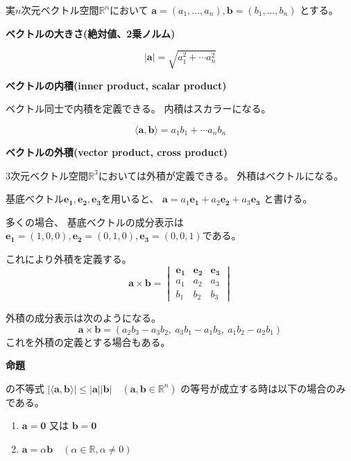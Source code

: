 \documentclass[12pt,b5paper]{ltjsarticle}
\begin{document}
実$n$次元ベクトル空間$\mathbb{R}^n$において
$\bm{a}=(a_1,\dots,a_n), \bm{b}=(b_1,\dots,b_n)$
とする。

\textbf{ベクトルの大きさ(絶対値、2乗ノルム)}

\begin{equation}
 \lvert \bm{a} \rvert = \sqrt{ a_1^2 + \cdots a_n^2}
\end{equation}

\textbf{ベクトルの内積(inner product, scalar product)}

ベクトル同士で内積を定義できる。
内積はスカラーになる。

\begin{equation}
 \langle \bm{a}, \bm{b} \rangle = a_1b_1 + \cdots a_nb_n
\end{equation}

\textbf{ベクトルの外積(vector product, cross product)}

$3$次元ベクトル空間$\mathbb{R}^3$においては外積が定義できる。
外積はベクトルになる。

基底ベクトル$\bm{e_1}, \bm{e_2}, \bm{e_3}$を用いると、
$\bm{a}=a_1\bm{e_1} + a_2\bm{e_2} + a_3\bm{e_3}$
と書ける。

多くの場合、
基底ベクトルの成分表示は
$\bm{e_1}=(1,0,0), \bm{e_2}=(0,1,0), \bm{e_3}=(0,0,1)$である。

これにより外積を定義する。
\begin{equation}
 \bm{a}\times\bm{b} =
  \begin{vmatrix}
   \bm{e_1} & \bm{e_2} & \bm{e_3}\\
   a_1 & a_2 & a_3\\
   b_1 & b_2 & b_3
  \end{vmatrix}
\end{equation}

外積の成分表示は次のようになる。
\begin{equation}
 \bm{a}\times\bm{b} = (a_2b_3-a_3b_2, \ a_3b_1-a_1b_3, \ a_1b_2-a_2b_1)
\end{equation}
これを外積の定義とする場合もある。


\hrulefill

\textbf{命題}

の不等式
$
 \lvert \langle \bm{a}, \bm{b} \rangle \rvert
  \leq
 \lvert \bm{a} \rvert \lvert \bm{b} \rvert
\quad (\bm{a},\bm{b}\in\mathbb{R}^n)
$
の等号が成立する時は以下の場合のみである。
\begin{enumerate}
 \item $\bm{a}=\bm{0}$ 又は $\bm{b}=\bm{0}$
 \item $\bm{a}=\alpha\bm{b} \quad (\alpha\in\mathbb{R},\alpha\ne 0)$
\end{enumerate}
\end{document}
